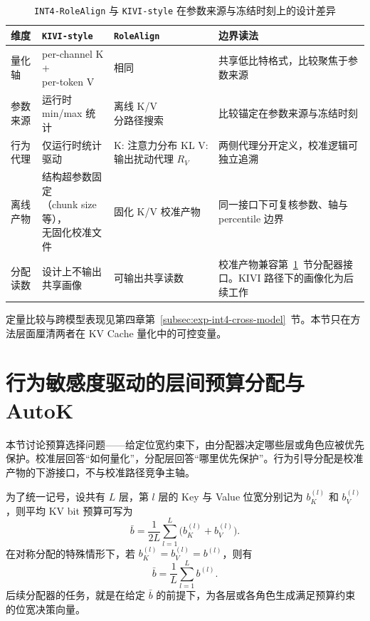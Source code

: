 \begin{table}[!htbp]
  \centering
  \caption{\texttt{INT4-RoleAlign} 与 \texttt{KIVI-style} 在参数来源与冻结时刻上的设计差异}
  \label{tab:ch3-rolealign-vs-kivi}
  \scriptsize
  \setlength{\tabcolsep}{3.2pt}
  \renewcommand{\arraystretch}{1.10}
  \begin{tabularx}{\linewidth}{>{\raggedright\arraybackslash}p{1.35cm}>{\raggedright\arraybackslash}p{2.10cm}>{\raggedright\arraybackslash}p{2.35cm}X}
    \toprule
    维度 & \texttt{KIVI-style} & \texttt{RoleAlign} & 边界读法 \\
    \midrule
    量化轴 & \makecell[l]{per-channel K +\\per-token V} & 相同 & 共享低比特格式，比较聚焦于参数来源 \\
    参数来源 & 运行时 min/max 统计 & \makecell[l]{离线 K/V\\分路径搜索} & 比较锚定在参数来源与冻结时刻 \\
    行为代理 & 仅运行时统计驱动 & \makecell[l]{K: 注意力分布 KL\\V: 输出扰动代理 $R_V$} & 两侧代理分开定义，校准逻辑可独立追溯 \\
    离线产物 & \makecell[l]{结构超参数固定 \\（chunk size 等），\\无固化校准文件} & 固化 K/V 校准产物 & 同一接口下可复核参数、轴与 percentile 边界 \\
    分配读数 & \makecell[l]{设计上不输出\\共享画像} & 可输出共享读数 & 校准产物兼容第~\ref{sec:ch3-allocator}~节分配器接口。KIVI 路径下的画像化为后续工作 \\
    \bottomrule
  \end{tabularx}
\end{table}

定量比较与跨模型表现见第四章第~\ref{subsec:exp-int4-cross-model}~节。本节只在方法层面厘清两者在 KV Cache 量化中的可控变量。

\section{行为敏感度驱动的层间预算分配与 AutoK}
\label{sec:ch3-allocator}

本节讨论预算选择问题——给定位宽约束下，由分配器决定哪些层或角色应被优先保护。校准层回答“如何量化”，分配层回答“哪里优先保护”。行为引导分配是校准产物的下游接口，不与校准路径竞争主轴。

为了统一记号，设共有 $L$ 层，第 $l$ 层的 Key 与 Value 位宽分别记为 $b_K^{(l)}$ 和 $b_V^{(l)}$，则平均 KV bit 预算可写为
\begin{equation}
\bar b
=
\frac{1}{2L}\sum_{l=1}^{L}\bigl(b_K^{(l)}+b_V^{(l)}\bigr).
\end{equation}
在对称分配的特殊情形下，若 $b_K^{(l)}=b_V^{(l)}=b^{(l)}$，则有
\begin{equation}
\bar b
=
\frac{1}{L}\sum_{l=1}^{L} b^{(l)}.
\end{equation}
后续分配器的任务，就是在给定 $\bar b$ 的前提下，为各层或各角色生成满足预算约束的位宽决策向量。

